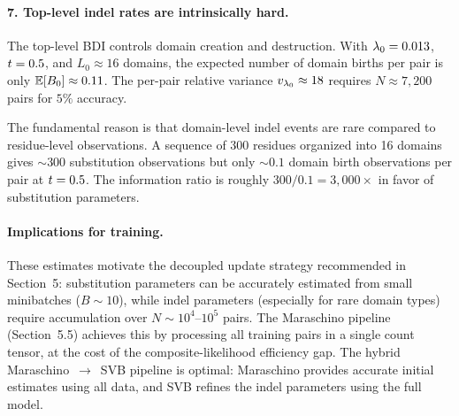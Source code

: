 \paragraph{7. Top-level indel rates are intrinsically hard.}
The top-level BDI controls domain creation and destruction.
With $\lambda_0 = 0.013$, $t = 0.5$, and $L_0 \approx 16$
domains, the expected number of domain births per pair is only
$\mathbb{E}[B_0] \approx 0.11$.
The per-pair relative variance $v_{\lambda_0} \approx 18$ requires
$N \approx 7{,}200$ pairs for $5\%$ accuracy.

The fundamental reason is that domain-level indel events are rare
compared to residue-level observations.
A sequence of 300 residues organized into 16 domains gives
$\sim 300$ substitution observations but only $\sim 0.1$ domain birth
observations per pair at $t = 0.5$.
The information ratio is roughly $300 / 0.1 = 3{,}000 \times$ in favor
of substitution parameters.

\paragraph{Implications for training.}
These estimates motivate the decoupled update strategy recommended
in Section~5: substitution parameters can be accurately estimated
from small minibatches ($B \sim 10$), while indel parameters
(especially for rare domain types) require accumulation over
$N \sim 10^4$--$10^5$ pairs.
The Maraschino pipeline (Section~5.5) achieves this by processing
all training pairs in a single count tensor, at the cost of the
composite-likelihood efficiency gap.
The hybrid Maraschino~$\to$~SVB pipeline is optimal: Maraschino
provides accurate initial estimates using all data, and SVB refines
the indel parameters using the full model.
